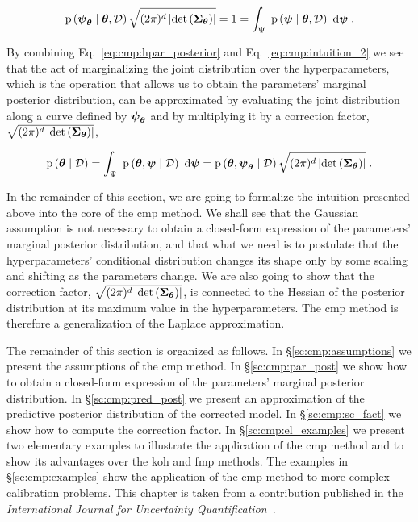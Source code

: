 \begin{equation}
    \mathrm{p} \left( \boldsymbol{\psi}_{\boldsymbol{\theta}} \mid \boldsymbol{\theta}, \mathcal{D} \right) \sqrt{(2\pi)^d \left| \mathrm{det}\left(\boldsymbol{\Sigma}_{\boldsymbol{\theta}}\right) \right|} = 1 = \displaystyle\int_{\Psi} \ \mathrm{p} \left( \boldsymbol{\psi} \mid \boldsymbol{\theta}, \mathcal{D} \right) \ \text{d} \boldsymbol{\psi} \;.
    \label{eq:cmp:intuition_2}
\end{equation}

By combining Eq.~\eqref{eq:cmp:hpar_posterior} and Eq.~\eqref{eq:cmp:intuition_2} we see that the act of marginalizing the joint distribution over the hyperparameters, which is the operation that allows us to obtain the parameters' marginal posterior distribution, can be approximated by evaluating the joint distribution along a curve defined by $\boldsymbol{\psi}_{\boldsymbol{\theta}}$ and by multiplying it by a correction factor, $\sqrt{(2\pi)^d \left| \mathrm{det}\left(\boldsymbol{\Sigma}_{\boldsymbol{\theta}}\right) \right|}$, 

\begin{equation}
    \mathrm{p} \left( \boldsymbol{\theta} \mid \mathcal{D} \right) = \displaystyle\int_{\Psi} \ \mathrm{p} \left( \boldsymbol{\theta}, \boldsymbol{\psi} \mid \mathcal{D} \right) \ \text{d} \boldsymbol{\psi}  =  \mathrm{p} \left( \boldsymbol{\theta}, \boldsymbol{\psi}_{\boldsymbol{\theta}} \mid \mathcal{D} \right)  \sqrt{(2\pi)^d \left| \mathrm{det}\left(\boldsymbol{\Sigma}_{\boldsymbol{\theta}}\right) \right|}  \;.   
\end{equation}

In the remainder of this section, we are going to formalize the intuition presented above into the core of the \gls{cmp} method. We shall see that the Gaussian assumption is not necessary to obtain a closed-form expression of the parameters' marginal posterior distribution, and that what we need is to postulate that the hyperparameters' conditional distribution changes its shape only by some scaling and shifting as the parameters change. We are also going to show that the correction factor, $\sqrt{(2\pi)^d \left| \mathrm{det}\left(\boldsymbol{\Sigma}_{\boldsymbol{\theta}}\right) \right|}$, is connected to the Hessian of the posterior distribution at its maximum value in the hyperparameters. The \gls{cmp} method is therefore a generalization of the Laplace approximation.

\smallskip
The remainder of this section is organized as follows. In \S\ref{sc:cmp:assumptions} we present the assumptions of the \gls{cmp} method. In \S\ref{sc:cmp:par_post} we show how to obtain a closed-form expression of the parameters' marginal posterior distribution. In \S\ref{sc:cmp:pred_post} we present an approximation of the predictive posterior distribution of the corrected model. In \S\ref{sc:cmp:sc_fact} we show how to compute the correction factor. In \S\ref{sc:cmp:el_examples} we present two elementary examples to illustrate the application of the \gls{cmp} method and to show its advantages over the \gls{koh} and \gls{fmp} methods. The examples in \S\ref{sc:cmp:examples} show the application of the \gls{cmp} method to more complex calibration problems. This chapter is taken from a contribution published in the \textit{International Journal for Uncertainty Quantification}~\cite{cmp}.

